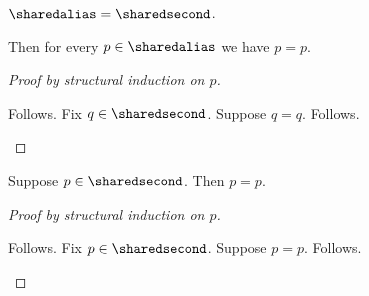 

\begin{abbreviation}\label{shared_alias}
    $\sharedalias=\sharedsecond$.
\end{abbreviation}

\begin{proposition}\label{shared_alias_induction}
    Then for every $p\in\sharedalias$ we have $p=p$.
\end{proposition}
\begin{proof}[Proof by structural induction on $p$]
    \begin{byCase}
         Follows.
            Fix $q\in\sharedsecond$.
            Suppose $q=q$.
            Follows.
    \end{byCase}
\end{proof}

\begin{proposition}\label{shared_active_induction}
    Suppose $p\in\sharedsecond$.
    Then $p=p$.
\end{proposition}
\begin{proof}[Proof by structural induction on $p$]
    \begin{byCase}
         Follows.
            Fix $p\in\sharedsecond$.
            Suppose $p=p$.
            Follows.
    \end{byCase}
\end{proof}

